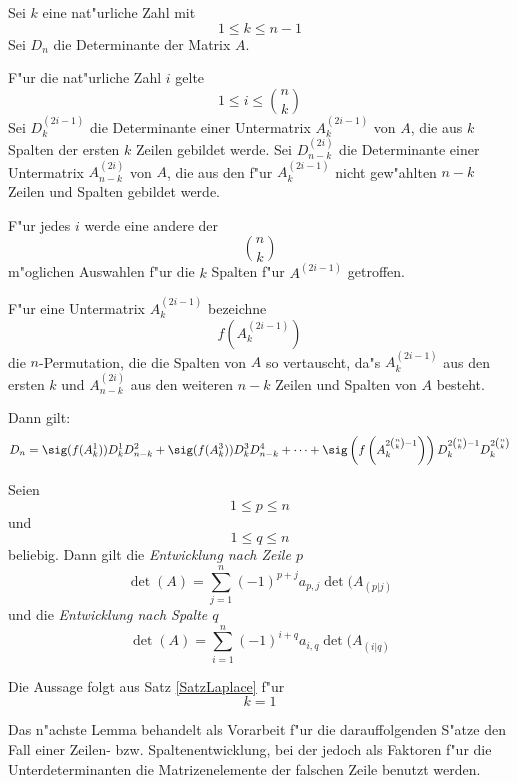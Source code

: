 \begin{satz}
\label{SatzLaplace}
    Sei $k$ eine nat"urliche Zahl mit
    \[ 1 \leq k \leq n-1 \] Sei $D_n$ die Determinante der Matrix $A$.

    F"ur die nat"urliche Zahl $i$ gelte \[ 1 \leq i \leq {n \choose k} \]
    Sei $D_k^{(2i-1)}$ die Determinante einer Untermatrix $A_k^{(2i-1)}$ von
    $A$, die aus $k$ Spalten der ersten $k$ Zeilen gebildet werde.
    Sei $D_{n-k}^{(2i)}$ die Determinante einer Untermatrix $A_{n-k}^{(2i)}$
    von
    $A$, die aus den f"ur $A_k^{(2i-1)}$ nicht gew"ahlten $n-k$ Zeilen und
    Spalten gebildet werde.

    F"ur jedes $i$ werde eine andere der \[ {n \choose k} \] m"oglichen
    Auswahlen f"ur die $k$ Spalten f"ur $A^{(2i-1)}$ getroffen.

    F"ur eine Untermatrix $A_k^{(2i-1)}$ bezeichne \[ f(A_k^{(2i-1)}) \] die
    $n$-Permutation, die die Spalten von $A$ so vertauscht, da"s
    $A_k^{(2i-1)}$ aus den ersten $k$ und $A_{n-k}^{(2i)}$
    aus den weiteren $n-k$ Zeilen und Spalten von $A$ besteht.

    Dann gilt:
    \begin{equation}
    \label{EquSatzLaplace}
    D_n = \sig(f(A_k^1)) D_k^1 D_{n-k}^2 + \sig(f(A_k^3)) D_k^3 D_{n-k}^4
          + \cdots
          + \sig \left( f \left( A_k^{2{n \choose k}-1} \right) \right)
            D_k^{2{n \choose k}-1} D_k^{2{n \choose k}}
    \end{equation}
\end{satz}

\begin{korollar}
\label{SatzEntw}
     Seien \[ 1 \leq p \leq n \] und \[ 1 \leq q \leq n \] beliebig.
     Dann gilt die {\em Entwicklung nach Zeile $p$}
     \[ \det(A)= \sum_{j=1}^n (-1)^{p+j} a_{p,j} \det(A_{(p|j)} \]
     und die {\em Entwicklung nach Spalte $q$}
     \[ \det(A)= \sum_{i=1}^n (-1)^{i+q} a_{i,q} \det(A_{(i|q)} \]
\end{korollar}
\begin{beweis}
    Die Aussage folgt aus Satz \ref{SatzLaplace} f"ur \[ k=1 \]
\end{beweis}

Das n"achste Lemma behandelt als Vorarbeit f"ur die darauffolgenden
S"atze den Fall einer Zeilen- bzw. Spaltenentwicklung, bei der jedoch
als Faktoren f"ur die Unterdeterminanten die Matrizenelemente der
falschen Zeile benutzt werden.

